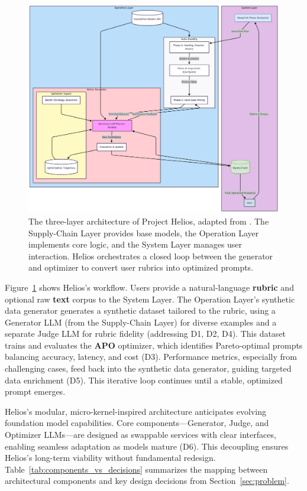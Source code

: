 \documentclass{article}
\begin{document}
\begin{figure}[H]
  \centering
  \includegraphics[width=\textwidth]{helios_architecture.png}
  \caption{The three-layer architecture of Project Helios, adapted from \cite{lu2024referencearchitecturedesigningfoundation}. The Supply-Chain Layer provides base models, the Operation Layer implements core logic, and the System Layer manages user interaction. Helios orchestrates a closed loop between the generator and optimizer to convert user rubrics into optimized prompts.}
  \label{fig:architecture}
\end{figure}

Figure~\ref{fig:architecture} shows Helios's workflow. Users provide a natural-language \textbf{rubric} and optional raw \textbf{text} corpus to the System Layer. The Operation Layer's synthetic data generator generates a synthetic dataset tailored to the rubric, using a Generator LLM (from the Supply-Chain Layer) for diverse examples and a separate Judge LLM for rubric fidelity (addressing D1, D2, D4). This dataset trains and evaluates the \textbf{APO} optimizer, which identifies Pareto-optimal prompts balancing accuracy, latency, and cost (D3). Performance metrics, especially from challenging cases, feed back into the synthetic data generator, guiding targeted data enrichment (D5). This iterative loop continues until a stable, optimized prompt emerges.

Helios's modular, micro-kernel-inspired architecture \citep{inbook} anticipates evolving foundation model capabilities. Core components—Generator, Judge, and Optimizer LLMs—are designed as swappable services with clear interfaces, enabling seamless adaptation as models mature (D6). This decoupling ensures Helios's long-term viability without fundamental redesign. Table~\ref{tab:components_vs_decisions} summarizes the mapping between architectural components and key design decisions from Section~\ref{sec:problem}.
\end{document}
